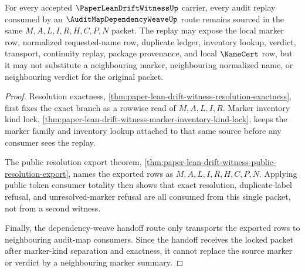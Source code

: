 \begin{theorem}
\label{thm:paper-lean-drift-witness-audit-replay-source-lock}
For every accepted $\PaperLeanDriftWitnessUp$ carrier, every audit replay consumed by an $\AuditMapDependencyWeaveUp$ route remains sourced in the same $M,A,L,I,R,H,C,P,N$ packet. The replay may expose the local marker row, normalized requested-name row, duplicate ledger, inventory lookup, verdict, transport, continuity replay, package provenance, and local $\NameCert$ row, but it may not substitute a neighbouring marker, neighbouring normalized name, or neighbouring verdict for the original packet.
\end{theorem}
\begin{proof}
Resolution exactness, \autoref{thm:paper-lean-drift-witness-resolution-exactness}, first fixes the exact branch as a rowwise read of $M,A,L,I,R$. Marker inventory kind lock, \autoref{thm:paper-lean-drift-witness-marker-inventory-kind-lock}, keeps the marker family and inventory lookup attached to that same source before any consumer sees the replay.

The public resolution export theorem, \autoref{thm:paper-lean-drift-witness-public-resolution-export}, names the exported rows as $M,A,L,I,R,H,C,P,N$. Applying public token consumer totality then shows that exact resolution, duplicate-label refusal, and unresolved-marker refusal are all consumed from this single packet, not from a second witness.

Finally, the dependency-weave handoff route only transports the exported rows to neighbouring audit-map consumers. Since the handoff receives the locked packet after marker-kind separation and exactness, it cannot replace the source marker or verdict by a neighbouring marker summary.
\end{proof}

